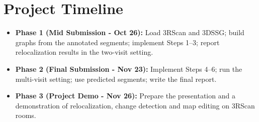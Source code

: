 \documentclass[11pt, a4paper]{article}
\begin{document}
\section{Project Timeline}
\begin{itemize}
  \item \textbf{Phase 1 (Mid Submission - Oct 26):} Load 3RScan and 3DSSG; build graphs from the annotated segments; implement Steps 1--3; report relocalization results in the two-visit setting.
  \item \textbf{Phase 2 (Final Submission - Nov 23):} Implement Steps 4--6; run the multi-visit setting; use predicted segments; write the final report.
  \item \textbf{Phase 3 (Project Demo - Nov 26):} Prepare the presentation and a demonstration of relocalization, change detection and map editing on 3RScan rooms.
\end{itemize}

\newpage


\end{document}
